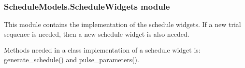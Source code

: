 \documentclass[letterpaper,10pt,english]{sphinxmanual}
\begin{document}
\begin{fulllineitems}

\begin{fulllineitems}
\label{\detokenize{NoSeMazeSchedule/ScheduleModels:ScheduleModels.ScheduleView.ScheduleModel.rowCount}}
\pysigstartsignatures
{}
\pysigstopsignatures
\end{fulllineitems}


\end{fulllineitems}


\begin{DUlineblock}{0em}
\item[] 
\end{DUlineblock}


\subsubsection{ScheduleModels.ScheduleWidgets module}
\label{\detokenize{NoSeMazeSchedule/ScheduleModels:module-ScheduleModels.ScheduleWidgets}}\label{\detokenize{NoSeMazeSchedule/ScheduleModels:schedulemodels-schedulewidgets-module}}
\sphinxAtStartPar
This module contains the implementation of the schedule widgets. If a new trial
sequence is needed, then a new schedule widget is also needed.

\sphinxAtStartPar
Methods needed in a class implementation of a schedule widget is:
generate\_schedule() and pulse\_parameters().
\end{document}
